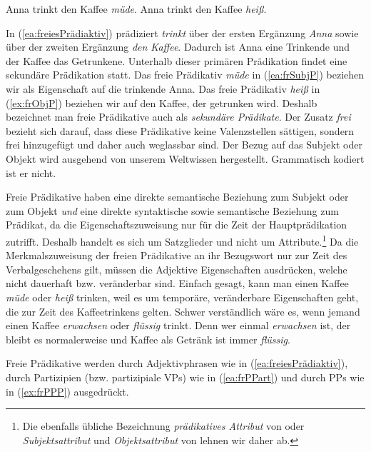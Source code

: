 \ea \label{ea:freiesPrädiaktiv}
\ea \label{ea:frSubjP} Anna trinkt den Kaffee \textit{müde}.
\ex \label{ex:frObjP} Anna trinkt den Kaffee \textit{heiß}.
\z 
\z 

In (\ref{ea:freiesPrädiaktiv}) prädiziert \textit{trinkt} über der ersten Ergänzung \textit{Anna} sowie über der zweiten Ergänzung \textit{den Kaffee}. Dadurch ist Anna eine Trinkende und der Kaffee das Getrunkene. Unterhalb dieser primären Prädikation findet eine sekundäre Prädikation statt. Das freie Prädikativ \textit{müde} in (\ref{ea:frSubjP}) beziehen wir als Eigenschaft auf die trinkende Anna. Das freie Prädikativ \textit{heiß} in (\ref{ex:frObjP}) beziehen wir auf den Kaffee, der getrunken wird. Deshalb bezeichnet man freie Prädikative auch als \textit{sekundäre Prädikate}. Der Zusatz \textit{frei} bezieht sich darauf, dass diese Prädikative keine Valenzstellen sättigen, sondern frei hinzugefügt und daher auch weglassbar sind. Der Bezug auf das Subjekt oder Objekt wird ausgehend von unserem Weltwissen hergestellt. Grammatisch kodiert ist er nicht. 

Freie Prädikative haben eine direkte semantische Beziehung zum Subjekt oder zum Objekt \textit{und} eine direkte syntaktische sowie semantische Beziehung zum Prädikat, da die Eigenschaftszuweisung nur für die Zeit der Hauptprädikation zutrifft. Deshalb handelt es sich um Satzglieder und nicht um Attribute.\footnote{Die ebenfalls übliche Bezeichnung \textit{prädikatives Attribut} von \citet[142]{Paul1880} oder \textit{Subjektsattribut} und \textit{Objektsattribut} von \citet[44]{Woellstein_Heilmann_Vikner_2006} lehnen wir daher ab.} Da die Merkmalszuweisung der freien Prädikative an ihr Bezugswort nur zur Zeit des Verbalgeschehens gilt, müssen die Adjektive Eigenschaften ausdrücken, welche nicht dauerhaft bzw. veränderbar sind. Einfach gesagt, kann man einen Kaffee \textit{müde} oder \textit{heiß} trinken, weil es um temporäre, veränderbare Eigenschaften geht, die zur Zeit des Kaffeetrinkens gelten. Schwer verständlich wäre es, wenn jemand einen Kaffee \textit{erwachsen} oder \textit{flüssig} trinkt. Denn wer einmal \textit{erwachsen} ist, der bleibt es normalerweise und Kaffee als Getränk ist immer \textit{flüssig}.

Freie Prädikative werden durch Adjektivphrasen wie in (\ref{ea:freiesPrädiaktiv}), durch Partizipien (bzw. partizipiale VPs) wie in (\ref{ea:frPPart}) und durch PPs wie in (\ref{ex:frPPP}) ausgedrückt. 

